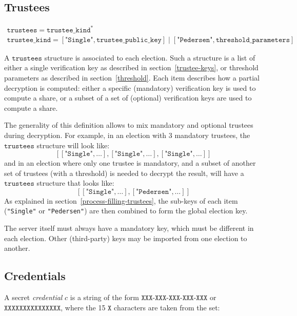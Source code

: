 \documentclass[a4paper]{article}
\begin{document}
\subsection{Trustees}
\label{trustees}

\begin{gather*}
  \texttt{trustees}=\texttt{trustee\_kind}^\ast\\
  \texttt{trustee\_kind}=
  [\texttt{"Single"},\texttt{trustee\_public\_key}]\mid
  [\texttt{"Pedersen"},\texttt{threshold\_parameters}]
\end{gather*}

A $\texttt{trustees}$ structure is associated to each election. Such a
structure is a list of either a single verification key as described in
section~\ref{trustee-keys}, or threshold parameters as described in
section~\ref{threshold}.  Each item describes how a partial decryption
is computed: either a specific (mandatory) verification key is used to
compute a share, or a subset of a set of (optional) verification keys
are used to compute a share.

The generality of this definition allows to mix mandatory and optional
trustees during decryption. For example, in an election with 3
mandatory trustees, the $\texttt{trustees}$ structure will look like:
\[
  [[\texttt{"Single"},\dotsc],[\texttt{"Single"},\dotsc],[\texttt{"Single"},\dotsc]]
\]
and in an election where only one trustee is mandatory, and a subset
of another set of trustees (with a threshold) is needed to decrypt the
result, will have a $\texttt{trustees}$ structure that looks like:
\[
  [[\texttt{"Single"},\dotsc],[\texttt{"Pedersen"},\dotsc]]
\]
As explained in section~\ref{process-filling-trustees}, the sub-keys
of each item (\texttt{"Single"} or \texttt{"Pedersen"}) are then
combined to form the global election key.

The server itself must always have a mandatory key, which must be
different in each election. Other (third-party) keys may be imported
from one election to another.

\subsection{Credentials}
\label{credentials}

\newcommand{\secret}{\texttt{secret}}

A secret \emph{credential} $c$ is a string of the form
$\texttt{XXX-XXX-XXX-XXX-XXX}$ or $\texttt{XXXXXXXXXXXXXXX}$, where
the 15 $\texttt{X}$ characters are taken from the set:
\end{document}
